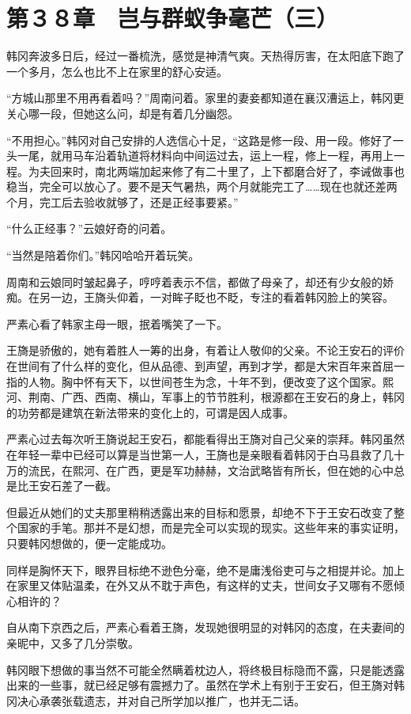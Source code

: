 \section{第３８章　岂与群蚁争毫芒（三）}

韩冈奔波多日后，经过一番梳洗，感觉是神清气爽。天热得厉害，在太阳底下跑了一个多月，怎么也比不上在家里的舒心安适。

“方城山那里不用再看着吗？”周南问着。家里的妻妾都知道在襄汉漕运上，韩冈更关心哪一段，但她这么问，却是有着几分幽怨。

“不用担心。”韩冈对自己安排的人选信心十足，“这路是修一段、用一段。修好了一头一尾，就用马车沿着轨道将材料向中间运过去，运上一程，修上一程，再用上一程。为夫回来时，南北两端加起来修了有二十里了，上下都磨合好了，李诫做事也稳当，完全可以放心了。要不是天气暑热，两个月就能完工了……现在也就还差两个月，完工后去验收就够了，还是正经事要紧。”

“什么正经事？”云娘好奇的问着。

“当然是陪着你们。”韩冈哈哈开着玩笑。

周南和云娘同时皱起鼻子，哼哼着表示不信，都做了母亲了，却还有少女般的娇痴。在另一边，王旖头仰着，一对眸子眨也不眨，专注的看着韩冈脸上的笑容。

严素心看了韩家主母一眼，抿着嘴笑了一下。

王旖是骄傲的，她有着胜人一筹的出身，有着让人敬仰的父亲。不论王安石的评价在世间有了什么样的变化，但从品德、到声望，再到才学，都是大宋百年来首屈一指的人物。胸中怀有天下，以世间苍生为念，十年不到，便改变了这个国家。熙河、荆南、广西、西南、横山，军事上的节节胜利，根源都在王安石的身上，韩冈的功劳都是建筑在新法带来的变化上的，可谓是因人成事。

严素心过去每次听王旖说起王安石，都能看得出王旖对自己父亲的崇拜。韩冈虽然在年轻一辈中已经可以算是当世第一人，王旖也是亲眼看着韩冈于白马县救了几十万的流民，在熙河、在广西，更是军功赫赫，文治武略皆有所长，但在她的心中总是比王安石差了一截。

但最近从她们的丈夫那里稍稍透露出来的目标和愿景，却绝不下于王安石改变了整个国家的手笔。那并不是幻想，而是完全可以实现的现实。这些年来的事实证明，只要韩冈想做的，便一定能成功。

同样是胸怀天下，眼界目标绝不逊色分毫，绝不是庸浅俗吏可与之相提并论。加上在家里又体贴温柔，在外又从不耽于声色，有这样的丈夫，世间女子又哪有不愿倾心相许的？

自从南下京西之后，严素心看着王旖，发现她很明显的对韩冈的态度，在夫妻间的亲昵中，又多了几分崇敬。

韩冈眼下想做的事当然不可能全然瞒着枕边人，将终极目标隐而不露，只是能透露出来的一些事，就已经足够有震撼力了。虽然在学术上有别于王安石，但王旖对韩冈决心承袭张载遗志，并对自己所学加以推广，也并无二话。

